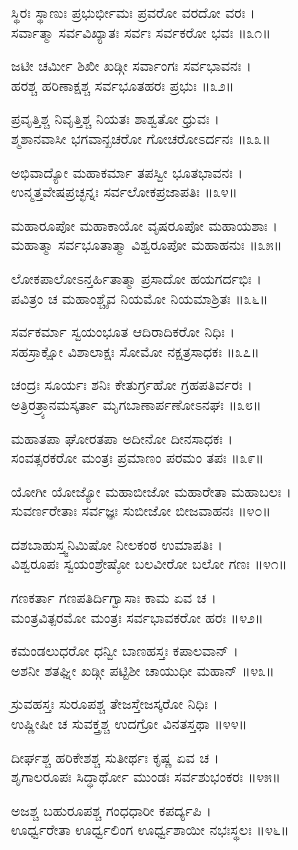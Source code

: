 ಸ್ಥಿರಃ ಸ್ಥಾಣುಃ ಪ್ರಭುರ್ಭೀಮಃ ಪ್ರವರೋ ವರದೋ ವರಃ ।\\
ಸರ್ವಾತ್ಮಾ ಸರ್ವವಿಖ್ಯಾತಃ ಸರ್ವಃ ಸರ್ವಕರೋ ಭವಃ ॥೩೧॥

ಜಟೀ ಚರ್ಮೀ ಶಿಖೀ ಖಡ್ಗೀ ಸರ್ವಾಂಗಃ ಸರ್ವಭಾವನಃ ।\\
ಹರಶ್ಚ ಹರಿಣಾಕ್ಷಶ್ಚ ಸರ್ವಭೂತಹರಃ ಪ್ರಭುಃ ॥೩೨॥

ಪ್ರವೃತ್ತಿಶ್ಚ ನಿವೃತ್ತಿಶ್ಚ ನಿಯತಃ ಶಾಶ್ವತೋ ಧ್ರುವಃ ।\\
ಶ್ಮಶಾನವಾಸೀ ಭಗವಾನ್ಖಚರೋ ಗೋಚರೋಽರ್ದನಃ ॥೩೩॥

ಅಭಿವಾದ್ಯೋ ಮಹಾಕರ್ಮಾ ತಪಸ್ವೀ ಭೂತಭಾವನಃ ।\\
ಉನ್ಮತ್ತವೇಷಪ್ರಚ್ಛನ್ನಃ ಸರ್ವಲೋಕಪ್ರಜಾಪತಿಃ ॥೩೪॥

ಮಹಾರೂಪೋ ಮಹಾಕಾಯೋ ವೃಷರೂಪೋ ಮಹಾಯಶಾಃ ।\\
ಮಹಾತ್ಮಾ ಸರ್ವಭೂತಾತ್ಮಾ ವಿಶ್ವರೂಪೋ ಮಹಾಹನುಃ ॥೩೫॥

ಲೋಕಪಾಲೋಽನ್ತರ್ಹಿತಾತ್ಮಾ ಪ್ರಸಾದೋ ಹಯಗರ್ದಭಿಃ ।\\
ಪವಿತ್ರಂ ಚ ಮಹಾಂಶ್ಚೈವ ನಿಯಮೋ ನಿಯಮಾಶ್ರಿತಃ ॥೩೬॥

ಸರ್ವಕರ್ಮಾ ಸ್ವಯಂಭೂತ ಆದಿರಾದಿಕರೋ ನಿಧಿಃ ।\\
ಸಹಸ್ರಾಕ್ಷೋ ವಿಶಾಲಾಕ್ಷಃ ಸೋಮೋ ನಕ್ಷತ್ರಸಾಧಕಃ ॥೩೭॥

ಚಂದ್ರಃ ಸೂರ್ಯಃ ಶನಿಃ ಕೇತುರ್ಗ್ರಹೋ ಗ್ರಹಪತಿರ್ವರಃ ।\\
ಅತ್ರಿರತ್ರ್ಯಾನಮಸ್ಕರ್ತಾ ಮೃಗಬಾಣಾರ್ಪಣೋಽನಘಃ ॥೩೮॥

ಮಹಾತಪಾ ಘೋರತಪಾ ಅದೀನೋ ದೀನಸಾಧಕಃ ।\\
ಸಂವತ್ಸರಕರೋ ಮಂತ್ರಃ ಪ್ರಮಾಣಂ ಪರಮಂ ತಪಃ ॥೩೯॥

ಯೋಗೀ ಯೋಜ್ಯೋ ಮಹಾಬೀಜೋ ಮಹಾರೇತಾ ಮಹಾಬಲಃ ।\\
ಸುವರ್ಣರೇತಾಃ ಸರ್ವಜ್ಞಃ ಸುಬೀಜೋ ಬೀಜವಾಹನಃ ॥೪೦॥

ದಶಬಾಹುಸ್ತ್ವನಿಮಿಷೋ ನೀಲಕಂಠ ಉಮಾಪತಿಃ ।\\
ವಿಶ್ವರೂಪಃ ಸ್ವಯಂಶ್ರೇಷ್ಠೋ ಬಲವೀರೋ ಬಲೋ ಗಣಃ ॥೪೧॥

ಗಣಕರ್ತಾ ಗಣಪತಿರ್ದಿಗ್ವಾಸಾಃ ಕಾಮ ಏವ ಚ ।\\
ಮಂತ್ರವಿತ್ಪರಮೋ ಮಂತ್ರಃ ಸರ್ವಭಾವಕರೋ ಹರಃ ॥೪೨॥

ಕಮಂಡಲುಧರೋ ಧನ್ವೀ ಬಾಣಹಸ್ತಃ ಕಪಾಲವಾನ್ ।\\
ಅಶನೀ ಶತಘ್ನೀ ಖಡ್ಗೀ ಪಟ್ಟಿಶೀ ಚಾಯುಧೀ ಮಹಾನ್ ॥೪೩॥

ಸ್ರುವಹಸ್ತಃ ಸುರೂಪಶ್ಚ ತೇಜಸ್ತೇಜಸ್ಕರೋ ನಿಧಿಃ ।\\
ಉಷ್ಣೀಷೀ ಚ ಸುವಕ್ತ್ರಶ್ಚ ಉದಗ್ರೋ ವಿನತಸ್ತಥಾ ॥೪೪॥

ದೀರ್ಘಶ್ಚ ಹರಿಕೇಶಶ್ಚ ಸುತೀರ್ಥಃ ಕೃಷ್ಣ ಏವ ಚ ।\\
ಶೃಗಾಲರೂಪಃ ಸಿದ್ಧಾರ್ಥೋ ಮುಂಡಃ ಸರ್ವಶುಭಂಕರಃ ॥೪೫॥

ಅಜಶ್ಚ ಬಹುರೂಪಶ್ಚ ಗಂಧಧಾರೀ ಕಪರ್ದ್ಯಪಿ ।\\
ಊರ್ಧ್ವರೇತಾ ಊರ್ಧ್ವಲಿಂಗ ಊರ್ಧ್ವಶಾಯೀ ನಭಃಸ್ಥಲಃ ॥೪೬॥

